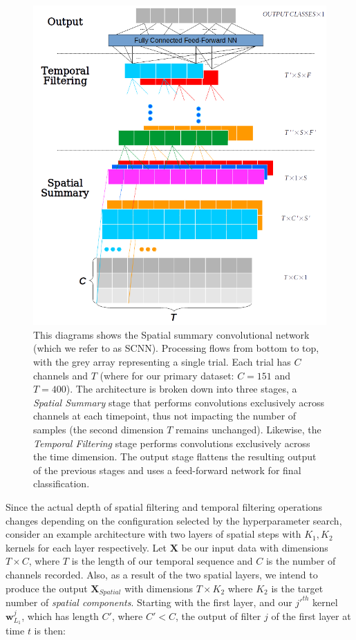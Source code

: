 \documentclass[utf8]{frontiersSCNS} %
\begin{document}
\begin{figure}[htp]
\includegraphics[width=\columnwidth]{SCNN_architecture.png}
\caption{This diagrams shows the Spatial summary convolutional network (which we refer to as SCNN). Processing flows from bottom to top, with the grey array representing a single trial. Each trial has $C$ channels and $T$ (where for our primary dataset: $C=151$ and $T=400$). The architecture is broken down into three stages, a {\em Spatial Summary} stage that performs convolutions exclusively across channels at each timepoint, thus not impacting the number of samples (the second dimension $T$ remains unchanged). Likewise, the {\em Temporal Filtering} stage performs convolutions exclusively across the time dimension. The output stage flattens the resulting output of the previous stages and uses a feed-forward network for final classification.}
\label{fig:scnn_arch}
\end{figure}

Since the actual depth of spatial filtering and temporal filtering operations changes depending on the configuration selected by the hyperparameter search, consider an example architecture with two layers of spatial steps with $K_1, K_2$ kernels for each layer respectively. Let $\boldsymbol{X}$ be our input data with dimensions $T \times C$, where $T$ is the length of our temporal sequence and $C$ is the number of channels recorded. Also, as a result of the two spatial layers, we intend to produce the output $\boldsymbol{X}_{Spatial}$ with dimensions $T \times K_2$ where $K_2$ is the target number of {\em spatial components}. Starting with the first layer, and our $j'^{th}$ kernel $\boldsymbol{w}_{L_1}^j$, which has length $C'$, where $C' < C$, the output of filter $j$ of the first layer at time $t$ is then:
\end{document}
